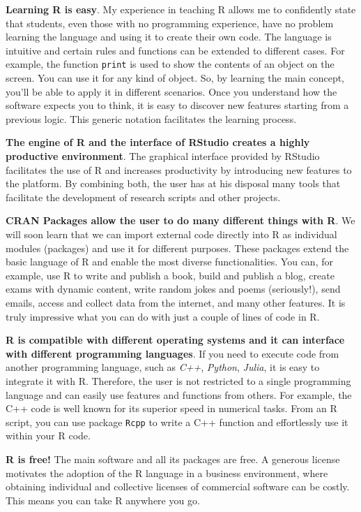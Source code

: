 \documentclass[
  12pt,
]{book}
\begin{document}
\textbf{Learning R is easy}. My experience in teaching R allows me to confidently state that students, even those with no programming experience, have no problem learning the language and using it to create their own code. The language is intuitive and certain rules and functions can be extended to different cases. For example, the function \texttt{print} is used to show the contents of an object on the screen. You can use it for any kind of object. So, by learning the main concept, you'll be able to apply it in different scenarios. Once you understand how the software expects you to think, it is easy to discover new features starting from a previous logic. This generic notation facilitates the learning process.

\textbf{The engine of R and the interface of RStudio creates a highly productive environment}. The graphical interface provided by RStudio facilitates the use of R and increases productivity by introducing new features to the platform. By combining both, the user has at his disposal many tools that facilitate the development of research scripts and other projects. 

\textbf{CRAN Packages allow the user to do many different things with R}. We will soon learn that we can import external code directly into R as individual modules (packages) and use it for different purposes. These packages extend the basic language of R and enable the most diverse functionalities. You can, for example, use R to write and publish a book, build and publish a blog, create exams with dynamic content, write random jokes and poems (seriously!), send emails, access and collect data from the internet, and many other features. It is truly impressive what you can do with just a couple of lines of code in R.

\textbf{R is compatible with different operating systems and it can interface with different programming languages}. If you need to execute code from another programming language, such as \emph{C++}, \emph{Python}, \emph{Julia}, it is easy to integrate it with R. Therefore, the user is not restricted to a single programming language and can easily use features and functions from others. For example, the C++ code is well known for its superior speed in numerical tasks. From an R script, you can use package \texttt{Rcpp} \citep{R-Rcpp} to write a C++ function and effortlessly use it within your R code.   

\textbf{R is free!} The main software and all its packages are free. A generous license motivates the adoption of the R language in a business environment, where obtaining individual and collective licenses of commercial software can be costly. This means you can take R anywhere you go.
\end{document}
